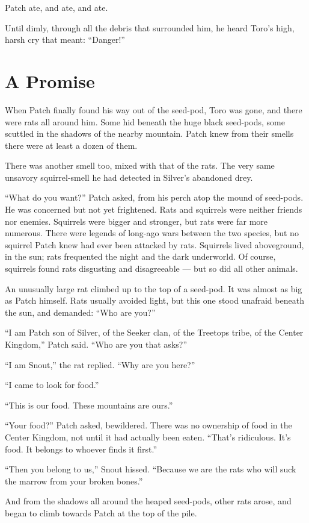 \documentclass[ebook,oneside,openany,12pt]{memoir}
\begin{document}
Patch ate, and ate, and ate.

Until dimly, through all the debris that surrounded him, he heard
Toro’s high, harsh cry that meant: “Danger!”


\section{A Promise}

When Patch finally found his way out of the seed-pod, Toro was gone,
and there were rats all around him. Some hid beneath the huge black
seed-pods, some scuttled in the shadows of the nearby mountain. Patch
knew from their smells there were at least a dozen of them.

There was another smell too, mixed with that of the rats. The very
same unsavory squirrel-smell he had detected in Silver’s abandoned
drey.

“What do you want?” Patch asked, from his perch atop the mound of
seed-pods. He was concerned but not yet frightened. Rats and squirrels
were neither friends nor enemies. Squirrels were bigger and stronger,
but rats were far more numerous. There were legends of long-ago wars
between the two species, but no squirrel Patch knew had ever been
attacked by rats. Squirrels lived aboveground, in the sun; rats
frequented the night and the dark underworld. Of course, squirrels
found rats disgusting and disagreeable — but so did all other animals.

An unusually large rat climbed up to the top of a seed-pod. It was
almost as big as Patch himself. Rats usually avoided light, but this
one stood unafraid beneath the sun, and demanded: “Who are you?”

“I am Patch son of Silver, of the Seeker clan, of the Treetops tribe,
of the Center Kingdom,” Patch said. “Who are you that asks?”

“I am Snout,” the rat replied. “Why are you here?”

“I came to look for food.”

“This is our food. These mountains are ours.”

“Your food?” Patch asked, bewildered. There was no ownership of food
in the Center Kingdom, not until it had actually been eaten. “That’s
ridiculous. It’s food. It belongs to whoever finds it first.”

“Then you belong to us,” Snout hissed. “Because we are the rats who
will suck the marrow from your broken bones.”

And from the shadows all around the heaped seed-pods, other rats
arose, and began to climb towards Patch at the top of the pile.
\end{document}
